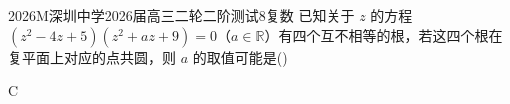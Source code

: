 
\begin{problem}{2026}{M}{深圳中学2026届高三二轮二阶测试}{8}{复数}
已知关于 $z$ 的方程 $(z^2-4z+5)(z^2+az+9)=0$（$a\in\mathbb{R}$）有四个互不相等的根，若这四个根在复平面上对应的点共圆，则 $a$ 的取值可能是(\hspace{1cm})
\begin{choices}
\end{choices}
\end{problem}

\begin{answer}
C
\end{answer}

